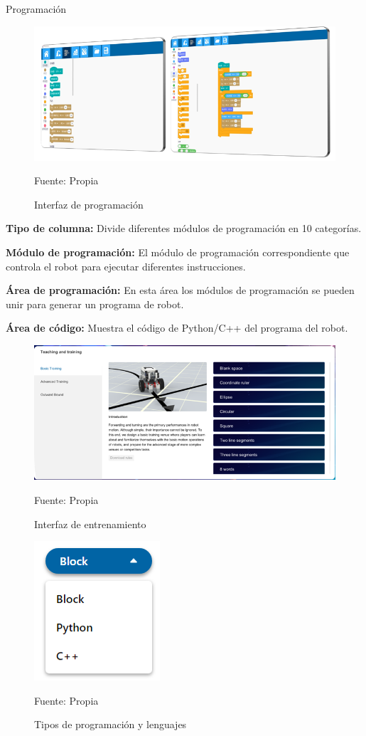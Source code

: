 Programación

\begin{figure}[H]
    \centering
    \includegraphics[scale = 0.90]{Imagenes/interfaz_prog.png}
    \caption{Interfaz de programación}{Fuente: Propia}
\end{figure}

\textbf{Tipo de columna:} Divide diferentes módulos de programación en 10 categorías.

\textbf{Módulo de programación:} El módulo de programación correspondiente que controla el robot para ejecutar diferentes instrucciones.

\textbf{Área de programación:} En esta área los módulos de programación se pueden unir para generar un programa de robot.

\textbf{Área de código:} Muestra el código de Python/C++ del programa del robot.

\begin{figure}[H]
    \centering
    \includegraphics[scale = 0.90]{Imagenes/areas_training.png}
    \caption{Interfaz de entrenamiento}{Fuente: Propia}
\end{figure}

\begin{figure}[H]
    \centering
    \includegraphics[scale = 0.90]{Imagenes/op_program.png}
    \caption{Tipos de programación y lenguajes}{Fuente: Propia}
\end{figure}

